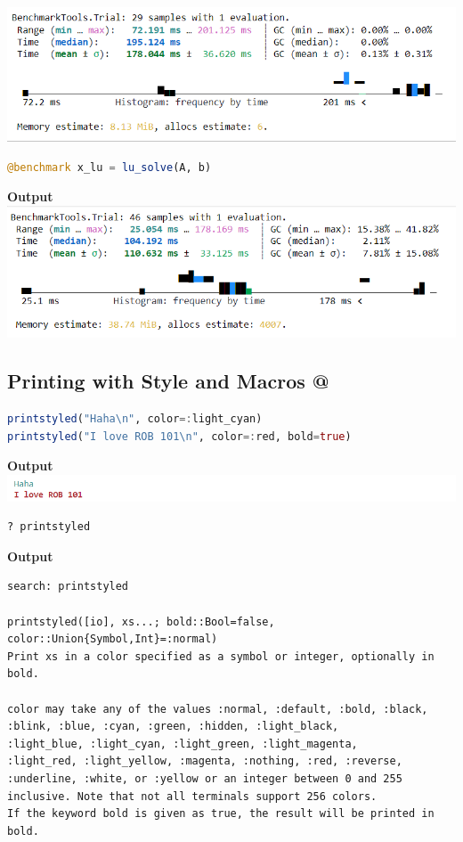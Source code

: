 \includegraphics[width=0.7\columnwidth]{graphics/Chap06/BenchmarkInvFunction.png}

\vspace*{.2cm}
\begin{lstlisting}[language=Julia,style=mystyle]
@benchmark x_lu = lu_solve(A, b)
\end{lstlisting}
\textbf{Output} \\

\includegraphics[width=0.7\columnwidth]{graphics/Chap06/BenchmarkLUSolution.png}%

\subsection{Printing with Style and Macros @}


\begin{lstlisting}[language=Julia,style=mystyle]
printstyled("Haha\n", color=:light_cyan)
printstyled("I love ROB 101\n", color=:red, bold=true)
\end{lstlisting}
\textbf{Output} 
\includegraphics[width=0.7\columnwidth]{graphics/Chap06/PrintingWithStyle.png}%


\begin{lstlisting}[language=Julia,style=mystyle]
? printstyled
\end{lstlisting}
\textbf{Output} 
\begin{verbatim}
search: printstyled

printstyled([io], xs...; bold::Bool=false, color::Union{Symbol,Int}=:normal)
Print xs in a color specified as a symbol or integer, optionally in bold.

color may take any of the values :normal, :default, :bold, :black, 
:blink, :blue, :cyan, :green, :hidden, :light_black, 
:light_blue, :light_cyan, :light_green, :light_magenta, 
:light_red, :light_yellow, :magenta, :nothing, :red, :reverse, 
:underline, :white, or :yellow or an integer between 0 and 255 
inclusive. Note that not all terminals support 256 colors. 
If the keyword bold is given as true, the result will be printed in bold.
\end{verbatim}


